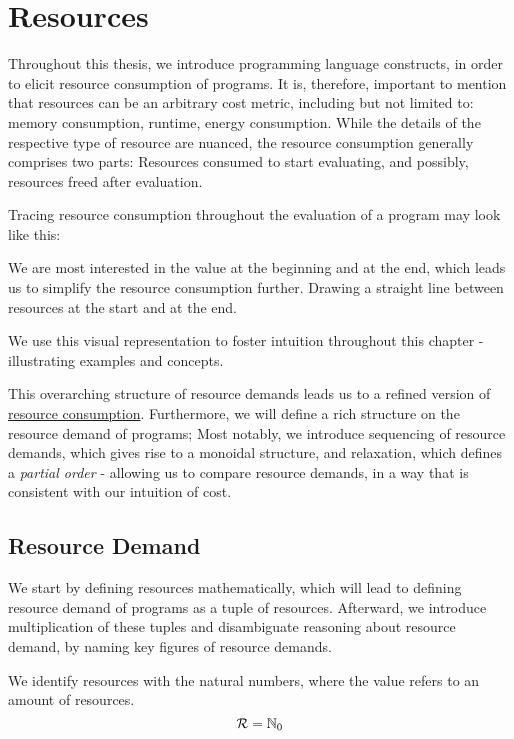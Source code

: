\chapter{Resources}

Throughout this thesis, we introduce programming language constructs, in order to elicit resource consumption of programs. It is, therefore, important to mention that resources can be an arbitrary cost metric, including but not limited to: memory consumption, runtime, energy consumption. While the details of the respective type of resource are nuanced, the resource consumption generally comprises two parts: Resources consumed to start evaluating, and possibly, resources freed after evaluation.

Tracing resource consumption throughout the evaluation of a program may look like this:


We are most interested in the value at the beginning and at the end, which leads us to simplify the resource consumption further. Drawing a straight line between resources at the start and at the end.


We use this visual representation to foster intuition throughout this chapter - illustrating examples and concepts.

This overarching structure of resource demands leads us to a refined version of \href{def:resource-consumption}{resource consumption}. Furthermore, we will define a rich structure on the resource demand of programs; Most notably, we introduce sequencing of resource demands, which gives rise to a monoidal structure, and relaxation, which defines a \emph{partial order} - allowing us to compare resource demands, in a way that is consistent with our intuition of cost.

\section{Resource Demand}

We start by defining resources mathematically, which will lead to defining resource demand of programs as a tuple of resources. Afterward, we introduce multiplication of these tuples and disambiguate reasoning about resource demand, by naming key figures of resource demands.

\begin{definition}[Resources]\label{def:resources}
   We identify resources with the natural numbers, where the value refers to an amount of resources.
   \[
      \mathcal{R} = \mathbb{N}_0
   \]
\end{definition}


